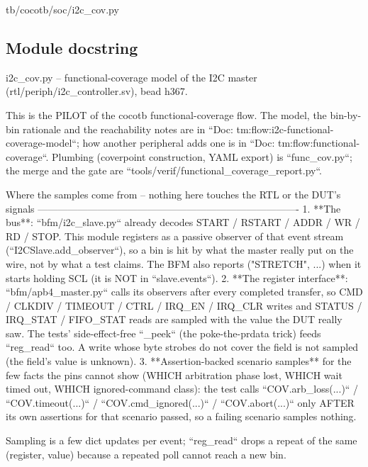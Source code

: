 \begin{relocated}{tb/cocotb/soc/i2c_cov.py}

\subsection*{Module docstring}

\begin{textblock}
i2c_cov.py -- functional-coverage model of the I2C master (rtl/periph/i2c_controller.sv), bead h367.

This is the PILOT of the cocotb functional-coverage flow.  The model, the bin-by-bin rationale and
the reachability notes are in ``Doc: tm:flow:i2c-functional-coverage-model``; how another
peripheral adds one is in ``Doc: tm:flow:functional-coverage``.  Plumbing (coverpoint
construction, YAML export) is ``func_cov.py``; the merge and the gate are
``tools/verif/functional_coverage_report.py``.

Where the samples come from -- nothing here touches the RTL or the DUT's signals
-------------------------------------------------------------------------------
1. **The bus**: ``bfm/i2c_slave.py`` already decodes START / RSTART / ADDR / WR / RD / STOP.  This
module registers as a passive observer of that event stream (``I2CSlave.add_observer``), so a
bin is hit by what the master really put on the wire, not by what a test claims.  The BFM also
reports ("STRETCH", ...) when it starts holding SCL (it is NOT in ``slave.events``).
2. **The register interface**: ``bfm/apb4_master.py`` calls its observers after every completed
transfer, so CMD / CLKDIV / TIMEOUT / CTRL / IRQ_EN / IRQ_CLR writes and STATUS / IRQ_STAT /
FIFO_STAT reads are sampled with the value the DUT really saw.  The tests' side-effect-free
``_peek`` (the poke-the-prdata trick) feeds ``reg_read`` too.  A write whose byte strobes do not
cover the field is not sampled (the field's value is unknown).
3. **Assertion-backed scenario samples** for the few facts the pins cannot show (WHICH arbitration
phase lost, WHICH wait timed out, WHICH ignored-command class): the test calls
``COV.arb_loss(...)`` / ``COV.timeout(...)`` / ``COV.cmd_ignored(...)`` / ``COV.abort(...)``
only AFTER its own assertions for that scenario passed, so a failing scenario samples nothing.

Sampling is a few dict updates per event; ``reg_read`` drops a repeat of the same (register,
value) because a repeated poll cannot reach a new bin.
\end{textblock}

\end{relocated}

